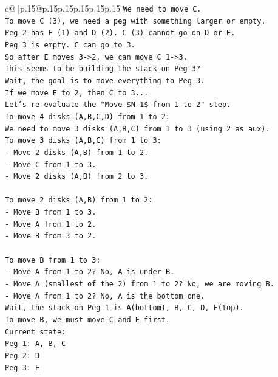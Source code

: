 \documentclass{article}
\begin{document}
{\begin{supertabular}{c@{$\;$}|p{.15\linewidth}@{}p{.15\linewidth}p{.15\linewidth}p{.15\linewidth}p{.15\linewidth}p{.15\linewidth}}
{{{\texttt{We need to move C.} \\
\texttt{To move C (3), we need a peg with something larger or empty.} \\
\texttt{Peg 2 has E (1) and D (2). C (3) cannot go on D or E.} \\
\texttt{Peg 3 is empty. C can go to 3.} \\
\texttt{So after E moves 3{-}>2, we can move C 1{-}>3.} \\
\texttt{This seems to be building the stack on Peg 3?} \\
\texttt{Wait, the goal is to move everything to Peg 3.} \\
\texttt{If we move E to 2, then C to 3...} \\
\texttt{Let's re{-}evaluate the "Move \$N{-}1\$ from 1 to 2" step.} \\
\texttt{To move 4 disks (A,B,C,D) from 1 to 2:} \\
\texttt{We need to move 3 disks (A,B,C) from 1 to 3 (using 2 as aux).} \\
\texttt{To move 3 disks (A,B,C) from 1 to 3:} \\
\texttt{{-} Move 2 disks (A,B) from 1 to 2.} \\
\texttt{{-} Move C from 1 to 3.} \\
\texttt{{-} Move 2 disks (A,B) from 2 to 3.} \\
\\ 
\texttt{To move 2 disks (A,B) from 1 to 2:} \\
\texttt{{-} Move B from 1 to 3.} \\
\texttt{{-} Move A from 1 to 2.} \\
\texttt{{-} Move B from 3 to 2.} \\
\\ 
\texttt{To move B from 1 to 3:} \\
\texttt{{-} Move A from 1 to 2? No, A is under B.} \\
\texttt{{-} Move A (smallest of the 2) from 1 to 2? No, we are moving B.} \\
\texttt{{-} Move A from 1 to 2? No, A is the bottom one.} \\
\texttt{Wait, the stack on Peg 1 is A(bottom), B, C, D, E(top).} \\
\texttt{To move B, we must move C and E first.} \\
\texttt{Current state:} \\
\texttt{Peg 1: A, B, C} \\
\texttt{Peg 2: D} \\
\texttt{Peg 3: E} \\
}}}
\end{supertabular}}
\end{document}
